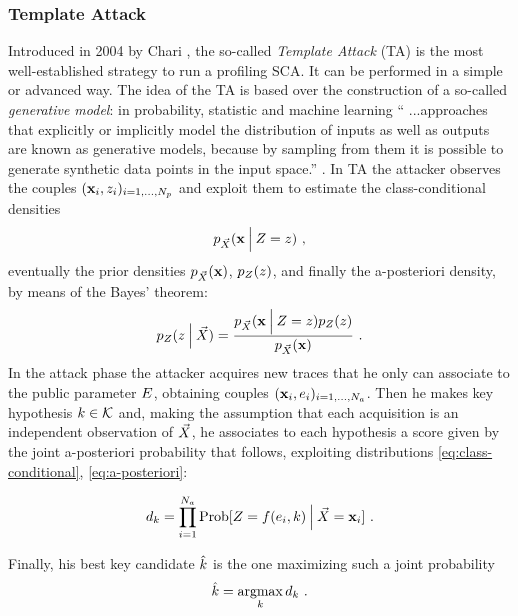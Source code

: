 \subsubsection{Template Attack}\label{sec:TA}
Introduced in 2004 by Chari \cite{Chari2003}, the so-called \emph{Template Attack} (TA) is the most well-established strategy to run a profiling SCA. It can be performed in a simple or advanced way. The idea of the TA is based over the construction of a so-called \emph{generative model}: in probability, statistic and machine learning \enquote{ ...approaches that explicitly or implicitly model the distribution of inputs as well as outputs are known as generative models, because by sampling from them it is possible to generate synthetic data points in the input space.} \cite{christopher2006pattern}.
In TA the attacker observes the couples $(\textbf{x}_i, z_i)_{i=1, \dots , N_p}$  and exploit them to estimate the class-conditional densities  
\begin{equation}\label{eq:class-conditional}
p_{\vec{X}}(\textbf{x} \:\Big\vert\: Z = z)\mbox{ ,}
\end{equation}
eventually the prior densities $p_{\vec{X}}(\textbf{x})$, $p_{Z}(z)$, and finally the a-posteriori density, by means of the Bayes' theorem:
\begin{equation}\label{eq:a-posteriori}
p_{Z}(z \:\Big\vert\: \vec{X}) = \frac{p_{\vec{X}}(\textbf{x} \:\Big\vert\: Z = z)p_{Z}(z)} {p_{\vec{X}}(\textbf{x})}\mbox{ .}
\end{equation}
In the attack phase the attacker acquires new traces that he only can associate to the public parameter $E$, obtaining couples  $(\textbf{x}_i, e_i)_{i=1, \dots , N_a}$. Then he makes key hypothesis $k \in \mathcal{K}$ and, making the assumption that each acquisition is an independent observation of $\vec{X}$, he associates to each hypothesis a score given by the joint a-posteriori probability that follows, exploiting distributions \eqref{eq:class-conditional}, \eqref{eq:a-posteriori}:

\begin{equation}
d_{k} = \prod_{i=1}^{N_a}\mathrm{Prob}[Z = f(e_i,k) \:\Big\vert\: \vec{X} = \textbf{x}_i] \mbox{ .}
\end{equation}

Finally, his best key candidate $\hat{k}$ is the one maximizing such a joint probability
\begin{equation}\label{eq:max_classifier}
\hat{k} = \operatorname*{argmax}_{k} d_{k} \mbox{ .}
\end{equation}

